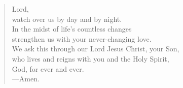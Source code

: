 \prayer

\setlength{\leftmargini}{\prayerleftmargini}

\begin{verse}
Lord,\\
watch over us by day and by night.\\
In the midst of life’s countless changes\\
strengthen us with your never-changing love.\\
We ask this through our Lord Jesus Christ, your Son,\\
who lives and reigns with you and the Holy Spirit,\\
God, for ever and ever.\\
{\color{red}---\thinspace}Amen.
\end{verse}

\setlength{\leftmargini}{\defleftmargini}